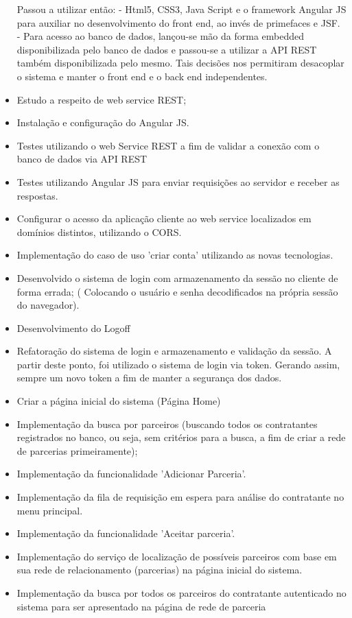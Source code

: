 \begin{itemize}
			Passou a utilizar então:
			- Html5, CSS3, Java Script e o framework Angular JS para auxiliar no desenvolvimento do front end, ao invés de primefaces e JSF.
			- Para acesso ao banco de dados, lançou-se mão da forma embedded disponibilizada pelo banco de dados e passou-se a utilizar a API REST também disponibilizada pelo mesmo. Tais decisões nos permitiram desacoplar o sistema e manter o front end e o back end independentes.
		\item Estudo a respeito de web service REST;
		\item Instalação e configuração do Angular JS. 
		\item Testes utilizando o web Service REST a fim de validar a conexão com o banco de dados via API REST 
		\item Testes utilizando Angular JS para enviar requisições ao servidor e receber as respostas. 
		\item Configurar o acesso da aplicação cliente ao web service localizados em domínios distintos, utilizando o CORS. 
		\item Implementação do caso de uso 'criar conta' utilizando as novas tecnologias.
		\item Desenvolvido o sistema de login com armazenamento da sessão no cliente de forma errada; ( Colocando o usuário e senha decodificados na própria sessão do navegador).
		\item Desenvolvimento do Logoff
		\item Refatoração do sistema de login e armazenamento e validação da sessão. A partir deste ponto, foi utilizado o sistema de login via token. Gerando assim, sempre um novo token a fim de manter a segurança dos dados. 
		\item Criar a página inicial do sistema (Página Home)
		\item Implementação da busca por parceiros (buscando todos os contratantes registrados no banco, ou seja, sem critérios para a busca, a fim de criar a rede de parcerias primeiramente);
		\item Implementação da funcionalidade 'Adicionar Parceria'.
		\item Implementação da fila de requisição em espera para análise do contratante no menu principal.
		\item Implementação da funcionalidade 'Aceitar parceria'.
		\item Implementação do serviço de localização de possíveis parceiros com base em sua rede de relacionamento (parcerias) na página inicial do sistema.
		\item Implementação da busca por todos os parceiros do contratante autenticado no sistema para ser apresentado na página de rede de parceria

\end{itemize}

